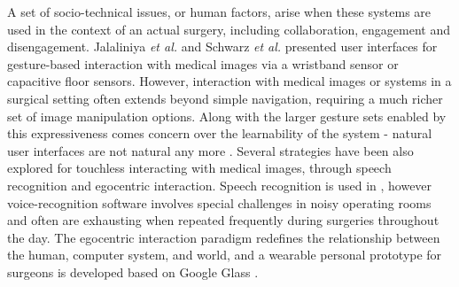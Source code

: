 A set of socio-technical issues, or human factors, arise when these systems are used in the context of an actual surgery, including collaboration, engagement and disengagement. 
Jalaliniya \textit{et al.} \cite{Jalaliniya2013} and Schwarz \textit{et al.} \cite{Schwarz2011a} presented user interfaces for gesture-based interaction with medical images via a wristband sensor or capacitive floor sensors. However, interaction with medical images or systems in a surgical setting often extends beyond simple navigation, requiring a much richer set of image manipulation options. 
Along with the larger gesture sets enabled by this expressiveness comes concern over the learnability of the system - natural user interfaces are not natural any more \cite{Norman2010a}. 
Several strategies have been also explored for touchless interacting with medical images, through speech recognition and egocentric interaction. 
Speech recognition is used in \cite{Ebert2012}, however voice-recognition software involves special challenges in noisy operating rooms and often are exhausting when repeated frequently during surgeries throughout the day. The egocentric interaction paradigm \cite{Pederson2010} redefines the relationship between the human, computer system, and world, and a wearable personal prototype for surgeons is developed based on Google Glass \cite{Jalaliniya2015}.